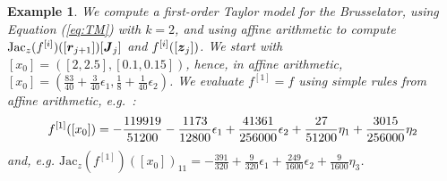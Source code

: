 \documentclass{sig-alternate-05-2015} %
\newcommand\ForAuthors[1]%
 {\par\smallskip                     %
  \begin{center}%
   \fbox%
   {\parbox{0.9\linewidth}%
    {\raggedright\sc--- #1}%
   }%
  \end{center}%
  \par\smallskip                     %
 }
\newtheorem{example}{Example}
\def\intvl#1{\mbox{$[ #1 ]$}}
\begin{document}
\begin{example}
\label{running3}
We compute a first-order Taylor model for the Brusselator, using Equation
(\ref{eq:TM}) with $k=2$, and using affine arithmetic to compute 
$\mbox{Jac}_z(f^{[i]})([\r_{j+1}])[\J_j]$ and $f^{[i]}([{\z}_j])$.
We start with 
$\intvl{x_0}=\left([2,2.5],[0.1,0.15]\right)$, hence, in affine arithmetic,
$\intvl{x_0}=\left(\frac{83}{40}+\frac{3}{40}\epsilon_1,
\frac{1}{8}+\frac{1}{40}\epsilon_2\right)$. We evaluate $f^{[1]}=f$ using
simple rules from affine arithmetic, e.g.~: 
\begin{equation}
f^{[1]}(\intvl{x_0}) 
= 
\small 
-\frac{119919}{51200}-\frac{1173}{12800} \epsilon_1+\frac{41361}{256000}\epsilon_2
\label{firstcompf1}
+\frac{27}{51200}\eta_1+\frac{3015}{256000}\eta_2
\end{equation}
\noindent and, e.g. $
\mbox{Jac}_z(f^{[1]})([x_0])_{11} %
= 
-\frac{391}{320}+\frac{9}{320}\epsilon_1+\frac{249}{1600}\epsilon_2+\frac{9}{1600}\eta_3
$. 

\end{example}
\end{document}
